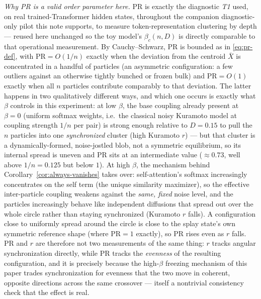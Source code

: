 \documentclass[11pt]{article}
\begin{document}
\emph{Why PR is a valid order parameter here.} $\mathrm{PR}$ is exactly the diagnostic \emph{T1} used, on real trained-Transformer hidden states, throughout the companion diagnostic-only pilot this note supports, to measure token-representation clustering by depth --- reused here unchanged so the toy model's $\beta_c(n,D)$ is directly comparable to that operational measurement. By Cauchy--Schwarz, $\mathrm{PR}$ is bounded as in \eqref{eq:pr-def}, with $\mathrm{PR}=O(1/n)$ exactly when the deviation from the centroid $\bar X$ is concentrated in a handful of particles (an asymmetric configuration: a few outliers against an otherwise tightly bunched or frozen bulk) and $\mathrm{PR}=O(1)$ exactly when all $n$ particles contribute comparably to that deviation. The latter happens in two qualitatively different ways, and which one occurs is exactly what $\beta$ controls in this experiment: at low $\beta$, the base coupling already present at $\beta=0$ (uniform softmax weights, i.e.\ the classical noisy Kuramoto model at coupling strength $1/n$ per pair) is strong enough relative to $D=0.15$ to pull the $n$ particles into one \emph{synchronized} cluster (high Kuramoto $r$) --- but that cluster is a dynamically-formed, noise-jostled blob, not a symmetric equilibrium, so its internal spread is uneven and $\mathrm{PR}$ sits at an intermediate value ($\approx0.73$, well above $1/n=0.125$ but below $1$). At high $\beta$, the mechanism behind Corollary~\ref{cor:always-vanishes} takes over: self-attention's softmax increasingly concentrates on the self term (the unique similarity maximizer), so the effective inter-particle coupling weakens against the \emph{same, fixed} noise level, and the particles increasingly behave like independent diffusions that spread out over the whole circle rather than staying synchronized (Kuramoto $r$ falls). A configuration close to uniformly spread around the circle is close to the splay state's own symmetric reference shape (where $\mathrm{PR}=1$ exactly), so $\mathrm{PR}$ rises even as $r$ falls. PR and $r$ are therefore not two measurements of the same thing: $r$ tracks angular synchronization directly, while PR tracks the \emph{evenness} of the resulting configuration, and it is precisely because the high-$\beta$ freezing mechanism of this paper trades synchronization for evenness that the two move in coherent, opposite directions across the same crossover --- itself a nontrivial consistency check that the effect is real.
\end{document}
